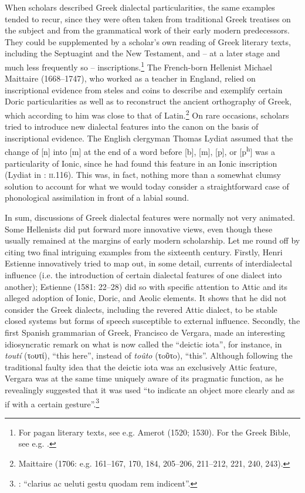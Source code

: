 When scholars described Greek dialectal particularities, the same examples tended to recur, since they were often taken from traditional Greek treatises on the subject and from the grammatical work of their early modern predecessors. They could be supplemented by a scholar’s own reading of Greek literary texts, including the Septuagint and the New Testament, and – at a later stage and much less frequently so – inscriptions.\footnote{For pagan literary texts, see e.g. Amerot (1520; 1530). For the Greek Bible, see e.g. \citet{Pasor1632}.} The French-born Hellenist Michael Maittaire (1668–1747), who worked as a teacher in England, relied on inscriptional evidence from steles and coins to describe and exemplify certain Doric particularities as well as to reconstruct the ancient orthography of Greek, which according to him was close to that of Latin.\footnote{Maittaire (1706: e.g. 161–167, 170, 184, 205–206, 211–212, 221, 240, 243).} On rare occasions, scholars tried to introduce new dialectal features into the canon on the basis of inscriptional evidence. The English clergyman Thomas Lydiat assumed that the change of [n] into [m] at the end of a word before [b], [m], [p], or [p\textsuperscript{h}] was a particularity of Ionic, since he had found this feature in an Ionic inscription (Lydiat in \citealt{Prideaux1676}: \textsc{ii}.116). This was, in fact, nothing more than a somewhat clumsy solution to account for what we would today consider a straightforward case of phonological assimilation in front of a labial sound.

In sum, discussions of Greek dialectal features were normally not very animated. Some Hellenists did put forward more innovative views, even though these usually remained at the margins of early modern scholarship. Let me round off by citing two final intriguing examples from the sixteenth century. Firstly, Henri Estienne innovatively tried to map out, in some detail, currents of interdialectal influence (i.e. the introduction of certain dialectal features of one dialect into another); Estienne (1581: 22–28) did so with specific attention to Attic and its alleged adoption of Ionic, Doric, and Aeolic elements. It shows that he did not consider the Greek dialects, including the revered Attic dialect, to be stable closed systems but forms of speech susceptible to external influence. Secondly, the first Spanish grammarian of Greek, Francisco de Vergara, made an interesting idiosyncratic remark on what is now called the “deictic iota”, for instance, in \textit{toutí} (τoυτί), “this here”, instead of \textit{toûto} (τoῦτo), “this”. Although following the traditional faulty idea that the deictic iota was an exclusively Attic feature, Vergara was at the same time uniquely aware of its pragmatic function, as he revealingly suggested that it was used “to indicate an object more clearly and as if with a certain gesture”.\footnote{\citet[218]{Vergara1537}: “clarius ac ueluti gestu quodam rem indicent”.}

